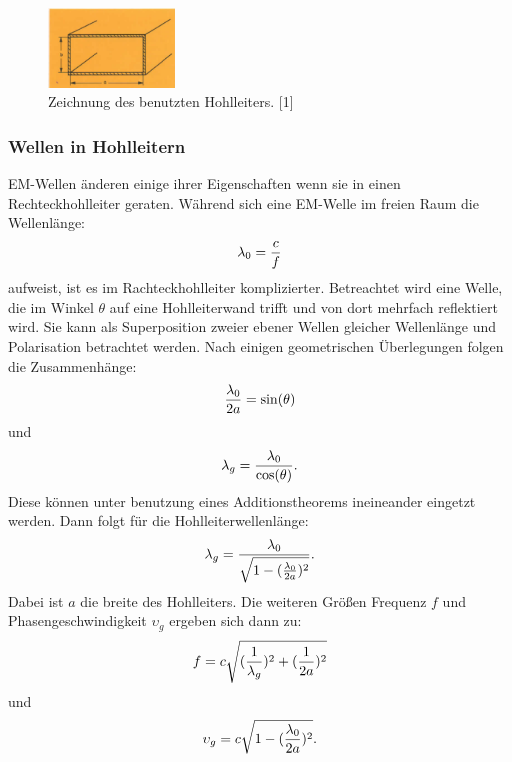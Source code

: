 \begin{figure}
    \centering
    \includegraphics[width=0.3\textwidth,angle=0]{content/grafiken/Hohlleiter.PNG}
    \caption{Zeichnung des benutzten Hohlleiters. [1]}
    \label{fig:Hohlleiter}
  \end{figure}

\subsubsection{Wellen in Hohlleitern}
EM-Wellen änderen einige ihrer Eigenschaften wenn sie in einen Rechteckhohlleiter geraten. Während sich eine 
EM-Welle im freien Raum die Wellenlänge:
\begin{equation}
    \lambda_0=\frac{c}{f}\\
\end{equation}
aufweist, ist es im Rachteckhohlleiter komplizierter. Betreachtet wird eine Welle, die im Winkel $\theta$ auf 
eine Hohlleiterwand trifft und von dort mehrfach reflektiert wird. Sie kann als Superposition zweier ebener 
Wellen gleicher Wellenlänge und Polarisation betrachtet werden. Nach einigen geometrischen Überlegungen
folgen die Zusammenhänge:
\begin{equation}
    \frac{\lambda_0}{2a}=\sin(\theta)\\
\end{equation}
und
\begin{equation}
    \lambda_g=\frac{\lambda_0}{\cos(\theta)}.\\
\end{equation}
Diese können unter benutzung eines Additionstheorems ineineander eingetzt werden. Dann folgt für die Hohlleiterwellenlänge:
\begin{equation}
    \lambda_g=\frac{\lambda_0}{\sqrt{1-(\frac{\lambda_0}{2a})^2}}.\\
\end{equation}
Dabei ist $a$ die breite des Hohlleiters. Die weiteren Größen Frequenz $f$ und Phasengeschwindigkeit $\upsilon_g$ 
ergeben sich dann zu:
\begin{equation}
    f=c\sqrt{(\frac{1}{\lambda_g})^2+(\frac{1}{2a})^2}\\
\end{equation}
und 
\begin{equation}
    \upsilon_g=c\sqrt{1-(\frac{\lambda_0}{2a})^2}.\\
\end{equation}